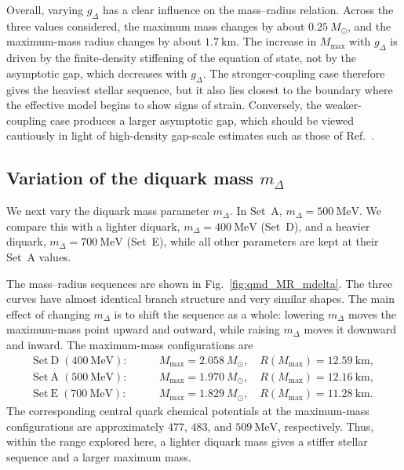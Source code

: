 Overall, varying \(g_\Delta\) has a clear influence on the
mass--radius relation. Across the three values considered, the maximum
mass changes by about \(0.25~M_\odot\), and the maximum-mass radius
changes by about \(1.7~\mathrm{km}\). The increase in \(M_{\max}\) with
\(g_\Delta\) is driven by the finite-density stiffening of the equation
of state, not by the asymptotic gap, which decreases with
\(g_\Delta\). The stronger-coupling case therefore gives the heaviest
stellar sequence, but it also lies closest to the boundary where the
effective model begins to show signs of strain. Conversely, the
weaker-coupling case produces a larger asymptotic gap, which should be
viewed cautiously in light of high-density gap-scale estimates such as
those of Ref.~\cite{Kurkela2024}.

\subsection*{Variation of the diquark mass \(m_\Delta\)}
\label{subsec:qmd_param_mdelta}

We next vary the diquark mass parameter \(m_\Delta\). In Set~A,
\(m_\Delta=500~\mathrm{MeV}\). We compare this with a lighter
diquark, \(m_\Delta=400~\mathrm{MeV}\) (Set~D), and a heavier diquark,
\(m_\Delta=700~\mathrm{MeV}\) (Set~E), while all other parameters are
kept at their Set~A values.

The mass--radius sequences are shown in
Fig.~\ref{fig:qmd_MR_mdelta}. The three curves have almost identical
branch structure and very similar shapes. The main effect of changing
\(m_\Delta\) is to shift the sequence as a whole: lowering
\(m_\Delta\) moves the maximum-mass point upward and outward, while
raising \(m_\Delta\) moves it downward and inward. The maximum-mass
configurations are
\begin{align}
\mathrm{Set~D}\;(400~\mathrm{MeV}): & \qquad M_{\max} = 2.058~M_\odot,
\quad R(M_{\max}) = 12.59~\mathrm{km},\\
\mathrm{Set~A}\;(500~\mathrm{MeV}): & \qquad M_{\max} = 1.970~M_\odot,
\quad R(M_{\max}) = 12.16~\mathrm{km},\\
\mathrm{Set~E}\;(700~\mathrm{MeV}): & \qquad M_{\max} = 1.829~M_\odot,
\quad R(M_{\max}) = 11.28~\mathrm{km}.
\end{align}
The corresponding central quark chemical potentials at the maximum-mass
configurations are approximately \(477\), \(483\), and
\(509~\mathrm{MeV}\), respectively. Thus, within the range explored
here, a lighter diquark mass gives a stiffer stellar sequence and a
larger maximum mass.

